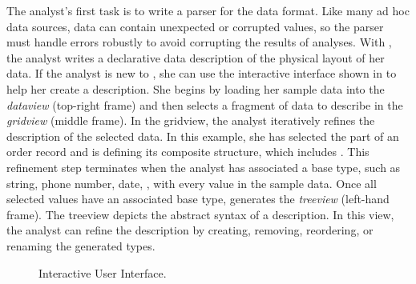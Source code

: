 The analyst's first task is to write a parser for the \dibbler{} data
format.  Like many ad hoc data sources, \dibbler{} data can contain
unexpected or corrupted values, so the parser must handle errors
robustly to avoid corrupting the results of analyses.  With \pads{},
the analyst writes a declarative data description of the physical
layout of her data.  
If the analyst is new to \pads{}, she can use the \launchpads{} interactive 
interface shown in  to help her create a \pads{}
description.  She begins by loading her sample data into
the {\it dataview} (top-right frame) and then selects a fragment of
data to describe in the {\it gridview} (middle frame).  In the
gridview, the analyst iteratively refines the description of the
selected data.  In this example, she has selected the 
part of an order record and is defining its composite structure, which
includes .  This refinement step terminates when the
analyst has associated a base type, such as string, phone
number, date, \etc{}, with every value in the sample data.  Once all
selected values have an associated base type, \textsc{\launchpads{}}
generates the {\it treeview} (left-hand frame).  The treeview depicts
the abstract syntax of a \pads{} description.  In this view, the
analyst can refine the description by creating, removing,
reordering, or renaming the generated types.
\begin{figure}
  \begin{center}
  \end{center}
  \caption{\launchpads{} Interactive User Interface.}
  \label{figure:launchpads}
\end{figure}

